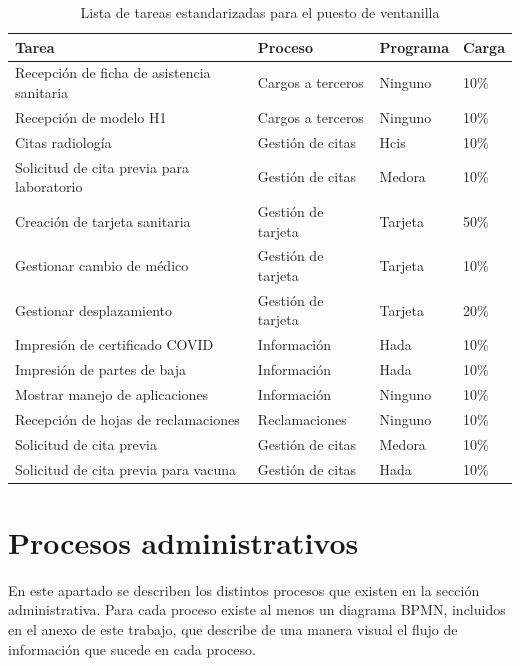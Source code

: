 \begin{table}
    \centering
    \begin{tabular}{llll}
        \toprule
        Tarea                                        & Proceso            & Programa & Carga \\
        \midrule
        Recepción de ficha de   asistencia sanitaria & Cargos a terceros  & Ninguno  & 10\%  \\
        Recepción   de modelo H1                     & Cargos a terceros  & Ninguno  & 10\%  \\
        Citas radiología                             & Gestión de citas   & Hcis     & 10\%  \\
        Solicitud   de cita previa para laboratorio  & Gestión de citas   & Medora   & 10\%  \\
        Creación de tarjeta sanitaria                & Gestión de tarjeta & Tarjeta  & 50\%  \\
        Gestionar   cambio de médico                 & Gestión de tarjeta & Tarjeta  & 10\%  \\
        Gestionar desplazamiento                     & Gestión de tarjeta & Tarjeta  & 20\%  \\
        Impresión   de certificado COVID             & Información        & Hada     & 10\%  \\
        Impresión de partes de baja                  & Información        & Hada     & 10\%  \\
        Mostrar   manejo de aplicaciones             & Información        & Ninguno  & 10\%  \\
        Recepción de hojas de reclamaciones          & Reclamaciones      & Ninguno  & 10\%  \\
        Solicitud   de cita previa                   & Gestión de citas   & Medora   & 10\%  \\
        Solicitud de cita previa para vacuna         & Gestión de citas   & Hada     & 10\%  \\
        \bottomrule
    \end{tabular}
    \caption{Lista de tareas estandarizadas para el puesto de ventanilla}
    \label{tab:tareas-ventanilla}
\end{table}

\section{Procesos administrativos}

En este apartado se describen los distintos procesos que existen en la sección administrativa.
Para cada proceso existe al menos un diagrama BPMN, incluidos en el anexo de este trabajo, que describe de una manera visual el flujo de información que sucede en cada proceso.

